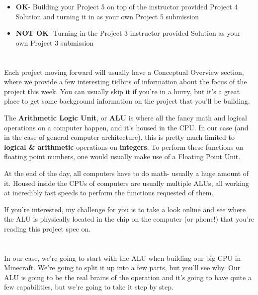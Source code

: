 \documentclass{article}
\begin{document}
\begin{itemize}
  \item \textbf{OK}- Building your Project 5 on top of the instructor provided Project 4 Solution and turning it in as your own Project 5 submission
  \item \textbf{NOT OK}- Turning in the Project 3 instructor provided Solution as your own Project 3 submission
\end{itemize}

\section{\selectfont{Conceptual Overview: The ALU}}

Each project moving forward will usually have a Conceptual Overview section, where we provide a few interesting tidbits of information about the focus of the project this week. You can usually skip it if you're in a hurry, but it's a great place to get some background information on the project that you'll be building.

The \textbf{Arithmetic Logic Unit}, or \textbf{ALU} is where all the fancy math and logical operations on a computer happen, and it's housed in the CPU. In our case (and in the case of general computer architecture), this is pretty much limited to \textbf{logical \& arithmetic} operations on \textbf{integers}. To perform these functions on floating point numbers, one would usually make use of a Floating Point Unit.

At the end of the day, all computers have to do math- usually a huge amount of it. Housed inside the CPUs of computers are usually multiple ALUs, all working at incredibly fast speeds to perform the functions requested of them.

If you're interested, my challenge for you is to take a look online and see where the ALU is physically located in the chip on the computer (or phone!) that you're reading this project spec on.

\section{\selectfont{Building the Logical Portion of the ALU}}

In our case, we're going to start with the ALU when building our big CPU in Minecraft. We're going to split it up into a few parts, but you'll see why. Our ALU is going to be the real brains of the operation and it's going to have quite a few capabilities, but we're going to take it step by step.
\end{document}

